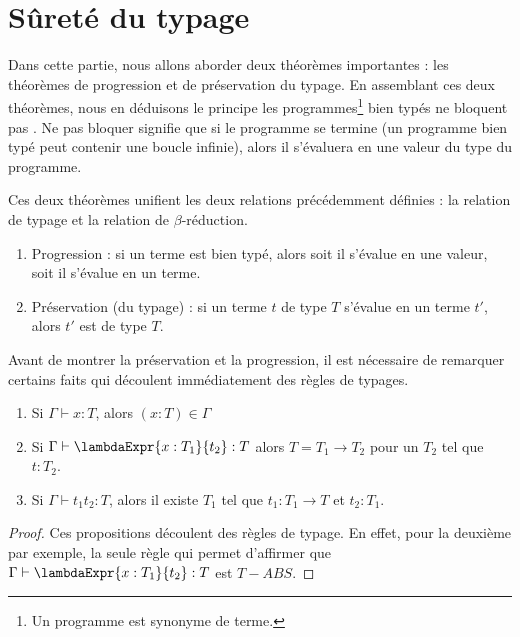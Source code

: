 \section{Sûreté du typage}

Dans cette partie, nous allons aborder deux théorèmes importantes : les
théorèmes de progression et de préservation du typage. En assemblant ces deux
théorèmes, nous en déduisons le principe \og les
programmes\footnote{Un programme est synonyme de terme.}
bien typés ne bloquent pas \fg. Ne pas bloquer signifie que si le programme se
termine (un programme bien typé peut contenir une boucle infinie), alors il
s'évaluera en une valeur du type du programme.

Ces deux théorèmes unifient les deux relations précédemment définies : la
relation de typage et la relation de $\beta$-réduction.

\begin{enumerate}
  \item Progression : si un terme est bien typé, alors soit il s'évalue en une
    valeur, soit il s'évalue en un terme.
    \item Préservation (du typage) : si un terme $t$ de type $T$ s'évalue en un terme $t'$,
      alors $t'$ est de type $T$.
\end{enumerate}

Avant de montrer la préservation et la progression, il est nécessaire de
remarquer certains faits qui découlent immédiatement des règles de typages.

\begin{lemma} 
  \begin{enumerate}
    \item Si $\Gamma \vdash x : T$, alors $(x : T) \in \Gamma$
    \item Si $\Gamma \vdash \lambdaExpr{x : T_{1}}{t_{2}} : T$ alors $T = T_{1}
      \rightarrow T_{2}$ pour un $T_{2}$ tel que $t : T_{2}$.
    \item Si $\Gamma \vdash t_{1} t_{2} : T$, alors il existe $T_{1}$
      tel que $t_{1} : T_{1} \rightarrow T$ et $t_{2} : T_{1}$.
  \end{enumerate}
\end{lemma}
  
\begin{proof}
  Ces propositions découlent des règles de typage. En effet, pour la deuxième
  par exemple, la seule règle qui permet d'affirmer que $\Gamma \vdash
  \lambdaExpr{x : T_{1}}{t_{2}} : T$ est $T-ABS$.
\end{proof}

